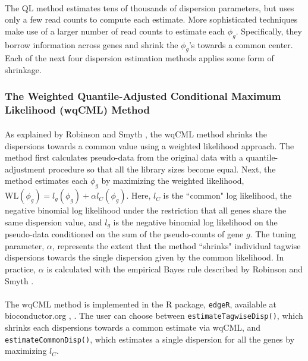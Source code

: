 \documentclass[10pt]{article}
\begin{document}
\paragraph{} \indent The QL method estimates tens of thousands of dispersion parameters, but uses only a few read counts to compute each estimate. More sophisticated techniques make use of a larger number of read counts to estimate each $\phi_g$. Specifically, they borrow information across genes and shrink the $\phi_g$'s towards a common center. Each of the next four dispersion estimation methods applies some form of shrinkage.


\subsubsection*{The Weighted Quantile-Adjusted Conditional Maximum Likelihood (wqCML) Method} \label{subsec:qcml}

\paragraph{} \indent As explained by Robinson and Smyth \cite{rs07}, the wqCML method shrinks the dispersions towards a common value using a weighted likelihood approach. The method first calculates pseudo-data from the original data with a quantile-adjustment procedure so that all the library sizes become equal. Next, the method estimates each $\phi_g$ by maximizing the weighted likelihood, $\text{WL}(\phi_g) = l_g(\phi_g) + \alpha l_C(\phi_g)$. Here, $l_C$ is the ``common" log likelihood, the negative binomial log likelihood under the restriction that all genes share the same dispersion value, and $l_g$ is the negative binomial log likelihood on the pseudo-data conditioned on the sum of the pseudo-counts of gene $g$. The tuning parameter, $\alpha$, represents the extent that the method ``shrinks" individual tagwise dispersions towards the single dispersion given by the common likelihood. In practice, $\alpha$ is calculated with the empirical Bayes rule described by Robinson and Smyth \cite{rs07}.

\paragraph{} \indent The wqCML method is implemented in the R package, {\tt edgeR}, available at {bioconductor.org} \cite{edger}, \cite{edger_m}. The user can choose between {\tt estimateTagwiseDisp()}, which shrinks each dispersions towards a common estimate via wqCML, and {\tt estimateCommonDisp()}, which estimates a single dispersion for all the genes by maximizing $l_C$.
\end{document}
